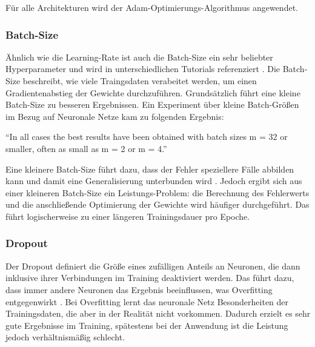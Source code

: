 Für alle Architekturen wird der Adam-Optimierungs-Algorithmus angewendet.

\subsubsection{Batch-Size}
Ähnlich wie die Learning-Rate ist auch die Batch-Size ein sehr beliebter Hyperparameter und wird in unterschiedlichen Tutorials referenziert \cite{tutorial:tune-batch-size-analyticsvidhya, tutorial:tune-batch-size-machinelearningmastery}.
Die Batch-Size beschreibt, wie viele Traingsdaten verabeitet werden, um einen Gradientenabstieg der Gewichte durchzuführen.
Grundsätzlich führt eine kleine Batch-Size zu besseren Ergebnissen.
Ein Experiment über kleine Batch-Größen im Bezug auf Neuronale Netze kam zu folgenden Ergebnis: 

\begin{displayquote}
	\enquote{In all cases the best results have been obtained with batch sizes m = 32 or smaller, often as small as m = 2 or m = 4.}
	\cite[S. 16, Z. 5-7]{small-batch-size}
\end{displayquote}

Eine kleinere Batch-Size führt dazu, dass der Fehler speziellere Fälle abbilden kann und damit eine Generalisierung unterbunden wird \cite{tutorial:tune-batch-size-machinelearningmastery}.
Jedoch ergibt sich aus einer kleineren Batch-Size ein Leistungs-Problem: die Berechnung des Fehlerwerts und die anschließende Optimierung der Gewichte wird häufiger durchgeführt.
Das führt logischerweise zu einer längeren Trainingsdauer pro Epoche.

\subsubsection{Dropout}
Der Dropout definiert die Größe eines zufälligen Anteils an Neuronen, die dann inklusive ihrer Verbindungen im Training deaktiviert werden.
Das führt dazu, dass immer andere Neuronen das Ergebnis beeinflussen, was Overfitting entgegenwirkt \cite{JMLR:v15:srivastava14a}.
Bei Overfitting lernt das neuronale Netz Besonderheiten der Trainingsdaten, die aber in der Realität nicht vorkommen.
Dadurch erzielt es sehr gute Ergebnisse im Training, spätestens bei der Anwendung ist die Leistung jedoch verhältnismäßig schlecht.


